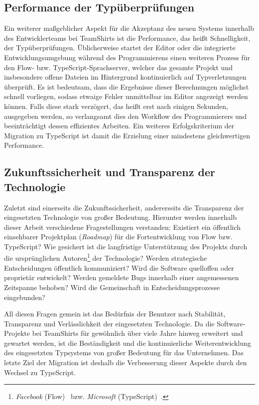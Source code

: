 \subsection{Performance der Typüberprüfungen}

Ein weiterer maßgeblicher Aspekt für die Akzeptanz des neuen Systems innerhalb des Entwicklerteams bei TeamShirts ist die Performance, das heißt Schnelligkeit, der Typüberprüfungen. Üblicherweise startet der Editor oder die integrierte Entwicklungsumgebung während des Programmierens einen weiteren Prozess für den Flow- bzw. TypeScript-Sprachserver, welcher das gesamte Projekt und insbesondere offene Dateien im Hintergrund kontinuierlich auf Typverletzungen überprüft. Es ist bedeutsam, dass die Ergebnisse dieser Berechnungen möglichst schnell vorliegen, sodass etwaige Fehler unmittelbar im Editor angezeigt werden können. Falls diese stark verzögert, das heißt erst nach einigen Sekunden, ausgegeben werden, so verlangsamt dies den Workflow des Programmierers und beeinträchtigt dessen effizientes Arbeiten. Ein weiteres Erfolgskriterium der Migration zu TypeScript ist damit die Erzielung einer mindestens gleichwertigen Performance.

\subsection{Zukunftssicherheit und Transparenz der Technologie}

Zuletzt sind einerseits die Zukunftssicherheit, andererseits die Transparenz der eingesetzten Technologie von großer Bedeutung. Hierunter werden innerhalb dieser Arbeit verschiedene Fragestellungen verstanden: Existiert ein öffentlich einsehbarer Projektplan (\textit{Roadmap}) für die Fortentwicklung von Flow bzw. TypeScript? Wie gesichert ist die langfristige Unterstützung des Projekts durch die ursprünglichen Autoren\footnote{\textit{Facebook} (Flow)~\autocite{FLOW:PAPER} bzw. \emph{Microsoft} (TypeScript)~\autocite{TYPESCRIPT:SPEC}.} der Technologie? Werden strategische Entscheidungen öffentlich kommuniziert? Wird die Software quelloffen oder proprietär entwickelt? Werden gemeldete Bugs innerhalb einer angemessenen Zeitspanne behoben? Wird die Gemeinschaft in Entscheidungsprozesse eingebunden?

All diesen Fragen gemein ist das Bedürfnis der Benutzer nach Stabilität, Transparenz und Verlässlichkeit der eingesetzten Technologie. Da die Software-Projekte bei TeamShirts für gewöhnlich über viele Jahre hinweg erweitert und gewartet werden, ist die Beständigkeit und die kontinuierliche Weiterentwicklung des eingesetzten Typsystems von großer Bedeutung für das Unternehmen. Das letzte Ziel der Migration ist deshalb die Verbesserung dieser Aspekte durch den Wechsel zu TypeScript.

